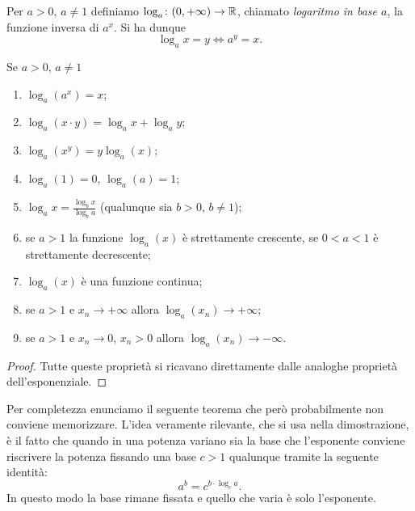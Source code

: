 \begin{definition}[logaritmo]
Per $a>0$, $a\neq 1$ definiamo $\log_a\colon (0,+\infty)\to \mathbb R$,
chiamato \emph{logaritmo in base $a$},
la funzione inversa di $a^x$.
Si ha dunque
\[
  \log_a x = y \iff a^y = x.
\]
\end{definition}

\begin{theorem}
Se $a>0$, $a\neq 1$
\begin{enumerate}
  \item $\log_a(a^x) = x$;
  \item $\log_a(x\cdot y)= \log_a x + \log_a y$;
  \item $\log_a(x^y) = y \log_a (x)$;
  \item $\log_a(1) = 0$, $\log_a(a)=1$;
  \item  $\displaystyle  \log_a x = \frac{\log_b x}{\log_b a}$
  (qualunque sia $b>0$, $b\neq 1$);
  \item se $a>1$ la funzione $\log_a(x)$ è strettamente crescente,
  se $0<a<1$ è strettamente decrescente;
  \item $\log_a(x)$ è una funzione continua;
  \item se $a>1$ e $x_n \to +\infty$ allora $\log_a(x_n)\to +\infty$;
  \item se $a>1$ e $x_n \to 0$, $x_n>0$ allora $\log_a(x_n)\to -\infty$.
\end{enumerate}
%
\begin{proof}
Tutte queste proprietà si ricavano direttamente dalle analoghe proprietà
dell'esponenziale.
\end{proof}
\end{theorem}

Per completezza enunciamo il seguente teorema che però
probabilmente non conviene memorizzare.
L'idea veramente rilevante, che si usa nella dimostrazione,
è il fatto che quando in una potenza variano sia la base
che l'esponente conviene riscrivere la potenza fissando
una base $c>1$ qualunque
tramite la seguente identità:
\[
  a^b = c^{b\cdot \log_c a}.
\]
In questo modo la base rimane fissata e quello
che varia è solo l'esponente.

